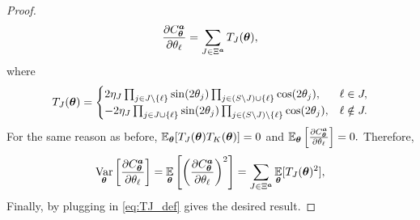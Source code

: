 \documentclass[10pt, twocolumn, a4paper]{article}
\theoremstyle{plain}
\theoremstyle{definition}
\theoremstyle{remark}
\begin{document}
\begin{proof}
\begin{equation}
\frac{\partial C^{\bm{a}}_{\bm{\theta}}}{\partial\theta_\ell}
=
\sum_{J\in\Xi^{\bm{a}}} T_J({\bm{\theta}}),
\end{equation}
where
\begin{equation}
T_J({\bm{\theta}})
=
\begin{cases}
2 \eta_J\prod_{j\in J\setminus\{\ell\}}\sin(2\theta_j)\prod_{j\in (S\setminus J) \cup \{\ell\}}\cos(2\theta_j), & \ell\in J,\\
-2 \eta_J \prod_{j\in J\cup \{\ell \}}\sin(2\theta_j)\prod_{j\in (S\setminus J)\setminus\{\ell\}}\cos(2\theta_j), & \ell\notin J.
\end{cases}
\label{eq:TJ_def}
\end{equation}
For the same reason as before, $\operatorname*{\mathbb{E}}_{{\bm{\theta}}}[T_J({\bm{\theta}})T_K({\bm{\theta}})] = 0 $ and  $\operatorname*{\mathbb{E}}_{{\bm{\theta}}} \left[ \frac{\partial C^{\bm{a}}_{\bm{\theta}}}{\partial\theta_\ell}\right] = 0.$
Therefore,
\begin{equation}
\operatorname*{Var}_{{\bm{\theta}}}\left[\frac{\partial C^{\bm{a}}_{\bm{\theta}}}{\partial\theta_\ell}\right]
=
\operatorname*{\mathbb{E}}_{{\bm{\theta}}}\left[\left(\frac{\partial C^{\bm{a}}_{\bm{\theta}}}{\partial\theta_\ell}\right)^2\right]
=
\sum_{J\in \Xi^{\bm{a}}}\operatorname*{\mathbb{E}}_{{\bm{\theta}}}[T_J({\bm{\theta}})^2],
\label{eq: symmetric derivative variance}
\end{equation}
Finally, by plugging in \cref{eq:TJ_def} gives the desired result.
\end{proof}
\end{document}
